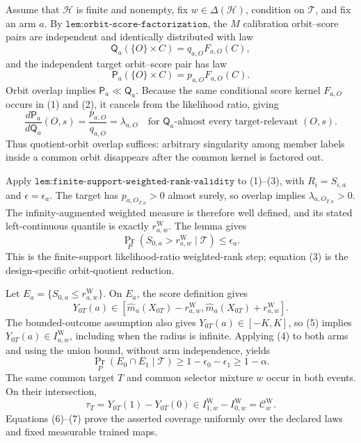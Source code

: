 Assume that \(\mathcal H\) is finite and nonempty, fix \(w\in\Delta(\mathcal H)\), condition on \(\mathcal T\), and fix an arm \(a\). By \(\texttt{lem:orbit-score-factorization}\), the \(M\) calibration orbit--score pairs are independent and identically distributed with law
\[
\mathsf Q_a(\{O\}\times C)=q_{a,O}F_{a,O}(C),
\tag{1}
\]
and the independent target orbit--score pair has law
\[
\mathsf P_a(\{O\}\times C)=p_{a,O}F_{a,O}(C).
\tag{2}
\]
Orbit overlap implies \(\mathsf P_a\ll\mathsf Q_a\). Because the same conditional score kernel \(F_{a,O}\) occurs in (1) and (2), it cancels from the likelihood ratio, giving
\[
\frac{d\mathsf P_a}{d\mathsf Q_a}(O,s)=\frac{p_{a,O}}{q_{a,O}}=\lambda_{a,O}
\quad\text{for }\mathsf Q_a\text{-almost every target-relevant }(O,s).
\tag{3}
\]
Thus quotient-orbit overlap suffices: arbitrary singularity among member labels inside a common orbit disappears after the common kernel is factored out.

Apply \(\texttt{lem:finite-support-weighted-rank-validity}\) to (1)--(3), with \(R_i=S_{i,a}\) and \(\epsilon=\epsilon_a\). The target has \(p_{a,O_{T,a}}>0\) almost surely, so overlap implies \(\lambda_{a,O_{T,a}}>0\). The infinity-augmented weighted measure is therefore well defined, and its stated left-continuous quantile is exactly \(r^{\mathrm W}_{a,w}\). The lemma gives
\[
\Pr_P\!\left(S_{0,a}>r^{\mathrm W}_{a,w}\mid\mathcal T\right)\le\epsilon_a.
\tag{4}
\]
This is the finite-support likelihood-ratio weighted-rank step; equation (3) is the design-specific orbit-quotient reduction.

Let \(E_a=\{S_{0,a}\le r^{\mathrm W}_{a,w}\}\). On \(E_a\), the score definition gives
\[
Y_{0T}(a)\in[\widehat m_a(X_{0T})-r^{\mathrm W}_{a,w},\widehat m_a(X_{0T})+r^{\mathrm W}_{a,w}].
\tag{5}
\]
The bounded-outcome assumption also gives \(Y_{0T}(a)\in[-K,K]\), so (5) implies \(Y_{0T}(a)\in I^{\mathrm W}_{a,w}\), including when the radius is infinite. Applying (4) to both arms and using the union bound, without arm independence, yields
\[
\Pr_P(E_0\cap E_1\mid\mathcal T)\ge1-\epsilon_0-\epsilon_1\ge1-\alpha.
\tag{6}
\]
The same common target \(T\) and common selector mixture \(w\) occur in both events. On their intersection,
\[
\tau_T=Y_{0T}(1)-Y_{0T}(0)\in I^{\mathrm W}_{1,w}-I^{\mathrm W}_{0,w}=\mathcal C^{\mathrm W}_w.
\tag{7}
\]
Equations (6)--(7) prove the asserted coverage uniformly over the declared laws and fixed measurable trained maps.

